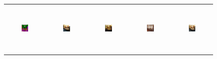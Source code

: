 \begin{figure}[]
\begin{tabular} {cc|cc|c}
\includegraphics[width=0.1932\textwidth,height=0.96in]{Images/Rec/ADE/label/ADE_val_00000309.png} & \includegraphics[width=0.1932\textwidth,height=0.96in]{Images/Rec/ADE/gt/ADE_val_00000309.jpg} &
\includegraphics[width=0.1932\textwidth,height=0.96in]{Images/Rec/ADE/pix2pixhd/ADE_val_00000309.jpg} &   \includegraphics[width=0.1932\textwidth,height=0.96in]{Images/Rec/ADE/spade/ADE_val_00000309.jpg} &  \includegraphics[width=0.1932\textwidth,height=0.96in]{Images/Rec/ADE/ours/ADE_val_00000309.png} \\



\end{tabular}
\end{figure}
